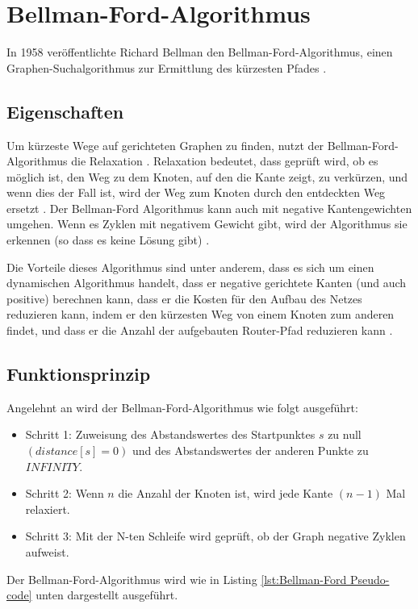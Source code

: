 \section{Bellman-Ford-Algorithmus}
\label{Bellman-Ford-Algorithmus}

In 1958 veröffentlichte Richard Bellman den Bellman-Ford-Algorithmus, einen Graphen-Suchalgorithmus zur Ermittlung des kürzesten 
Pfades \cite{Abusalim2020,Sulaiman18}.
\subsection{Eigenschaften}
Um kürzeste Wege auf gerichteten Graphen zu finden, nutzt der Bellman-Ford-Algorithmus die Relaxation \cite{Vaibhavi2014}.
Relaxation bedeutet, dass geprüft wird, ob es möglich ist, den Weg zu dem Knoten, auf den die Kante zeigt, zu verkürzen, 
und wenn dies der Fall ist, wird der Weg zum Knoten durch den entdeckten Weg ersetzt \cite{Abusalim2020}.
Der Bellman-Ford Algorithmus kann auch mit negative Kantengewichten umgehen. 
Wenn es Zyklen mit negativem Gewicht gibt, wird der Algorithmus sie erkennen (so dass es keine Lösung gibt) \cite{Vaibhavi2014}.

Die Vorteile dieses Algorithmus sind unter anderem, dass es sich um einen dynamischen Algorithmus handelt, dass er negative gerichtete 
Kanten (und auch positive) berechnen kann, dass er die Kosten für den Aufbau des Netzes reduzieren kann, indem er den kürzesten Weg von einem 
Knoten zum anderen findet, und dass er die Anzahl der aufgebauten Router-Pfad reduzieren kann \cite{Abusalim2020}.

\subsection{Funktionsprinzip}

Angelehnt an \cite{Abusalim2020} wird der Bellman-Ford-Algorithmus wie folgt ausgeführt:
\\
\begin{itemize}
	\item Schritt 1: Zuweisung des Abstandswertes des Startpunktes $s$ zu null $(distance[s] = 0)$ und des Abstandswertes der anderen Punkte zu 
		$INFINITY$.
	\item Schritt 2: Wenn $n$ die Anzahl der Knoten ist, wird jede Kante $(n - 1)$ Mal relaxiert. 
	\item Schritt 3: Mit der N-ten Schleife wird geprüft, ob der Graph negative Zyklen aufweist.
\end{itemize}
Der Bellman-Ford-Algorithmus wird wie in Listing  \ref{lst:Bellman-Ford Pseudo-code} unten dargestellt ausgeführt.


